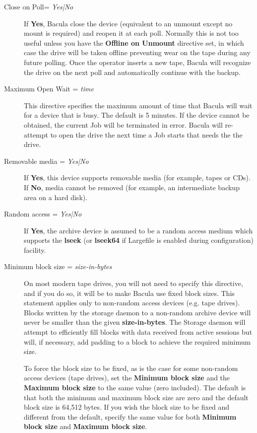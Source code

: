 \begin{description}
\item [Close on Poll= {\it Yes|No}]
   If {\bf Yes}, Bacula close the device (equivalent to  an unmount except no
mount is required) and reopen it at each  poll. Normally this is not too
useful unless you have the  {\bf Offline on Unmount} directive set, in which
case the  drive will be taken offline preventing wear on the tape  during any
future polling. Once the operator inserts a new  tape, Bacula will recognize
the drive on the next poll and  automatically continue with the backup. 

\item [Maximum Open Wait = {\it time}]
   This directive specifies the maximum amount of time that  Bacula will wait for
a device that is busy. The default is  5 minutes. If the device cannot be
obtained, the current Job will  be terminated in error. Bacula will re-attempt
to open the  drive the next time a Job starts that needs the the drive.

\item [Removable media = {\it Yes|No}]
   If {\bf Yes}, this device supports removable media (for  example, tapes or
CDs). If {\bf No}, media cannot be removed  (for example, an intermediate
backup area on a hard disk).  

\item [Random access = {\it Yes|No}]
   If {\bf Yes}, the archive device is assumed to be a random  access medium
which supports the {\bf lseek} (or  {\bf lseek64} if Largefile is enabled
during configuration) facility.  

\item [Minimum block size = {\it size-in-bytes}]
   On most modern tape drives, you will not need to  specify this directive, and
if you do so, it will be  to make Bacula use fixed block sizes.  This
statement applies only to non-random access devices (e.g.  tape drives).
Blocks written by the storage daemon to a non-random  archive device will
never be smaller than the given  {\bf size-in-bytes}. The Storage daemon will
attempt to  efficiently fill blocks with data received from active sessions
but  will, if necessary, add padding to a block to achieve the required 
minimum size.  

To force the block size to be fixed, as is  the case for some non-random
access devices (tape drives), set  the {\bf Minimum block size} and the {\bf
Maximum block size} to  the same value (zero included). The default is that
both the  minimum and maximum block size are zero and the default block size 
is 64,512 bytes. If you wish the block size to be fixed and  different from
the default, specify the same value for both  {\bf Minimum block size} and
{\bf Maximum block size}.  


\end{description}
